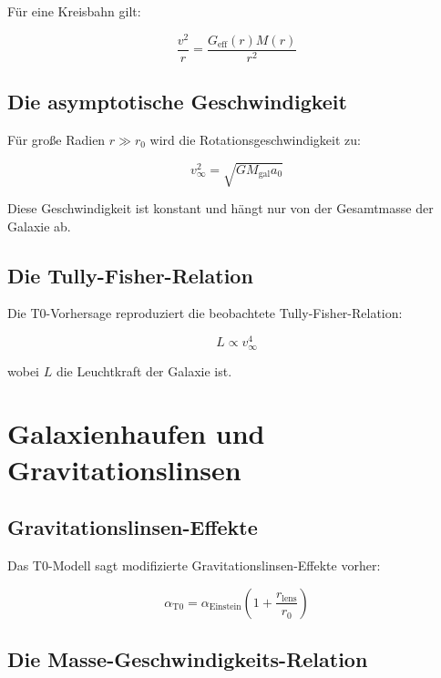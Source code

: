 \documentclass[12pt,a4paper]{report}
\begin{document}
	Für eine Kreisbahn gilt:
	
	\begin{equation}
		\frac{v^2}{r} = \frac{G_{\text{eff}}(r)M(r)}{r^2}
	\end{equation}
	
	\subsection{Die asymptotische Geschwindigkeit}
	
	Für große Radien $r \gg r_0$ wird die Rotationsgeschwindigkeit zu:
	
	\begin{equation}
		v_{\infty}^2 = \sqrt{GM_{\text{gal}}a_0}
	\end{equation}
	
	Diese Geschwindigkeit ist konstant und hängt nur von der Gesamtmasse der Galaxie ab.
	
	\subsection{Die Tully-Fisher-Relation}
	
	Die T0-Vorhersage reproduziert die beobachtete Tully-Fisher-Relation:
	
	\begin{equation}
		L \propto v_{\infty}^4
	\end{equation}
	
	wobei $L$ die Leuchtkraft der Galaxie ist.
	
	\section{Galaxienhaufen und Gravitationslinsen}
	
	\subsection{Gravitationslinsen-Effekte}
	
	Das T0-Modell sagt modifizierte Gravitationslinsen-Effekte vorher:
	
	\begin{equation}
		\alpha_{\text{T0}} = \alpha_{\text{Einstein}} \left(1 + \frac{r_{\text{lens}}}{r_0}\right)
	\end{equation}
	
	\subsection{Die Masse-Geschwindigkeits-Relation}
	
\end{document}
